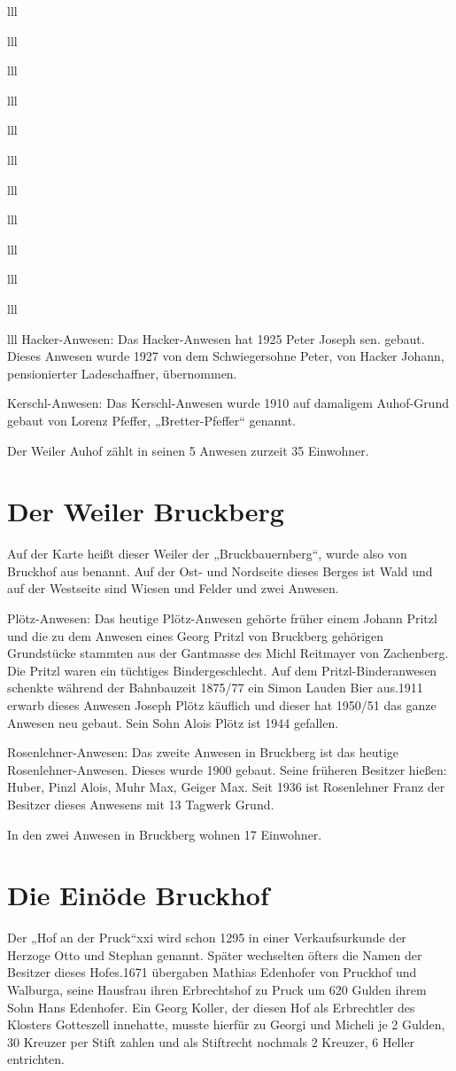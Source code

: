 \documentclass[12pt,a4pager]{book}
\begin{document}
\begin{tabuluar}{lll}
\begin{tabuluar}{lll}
\begin{tabuluar}{lll}
\begin{tabuluar}{lll}
\begin{tabuluar}{lll}
\begin{tabuluar}{lll}
\begin{tabuluar}{lll}
\begin{tabuluar}{lll}
\begin{tabuluar}{lll}
\begin{tabuluar}{lll}
\begin{tabuluar}{lll}
\begin{tabuluar}{lll}
Hacker-Anwesen: Das Hacker-Anwesen hat 1925 Peter Joseph sen. gebaut. Dieses
Anwesen wurde 1927 von dem Schwiegersohne Peter, von Hacker Johann,
pensionierter Ladeschaffner, übernommen.

Kerschl-Anwesen: Das Kerschl-Anwesen wurde 1910 auf damaligem Auhof-Grund gebaut
von Lorenz Pfeffer, „Bretter-Pfeffer“ genannt.

Der Weiler Auhof zählt in seinen 5 Anwesen zurzeit 35 Einwohner.

\section{Der Weiler Bruckberg}

Auf der Karte heißt dieser Weiler der „Bruckbauernberg“, wurde also von Bruckhof
aus benannt. Auf der Ost- und Nordseite dieses Berges ist Wald und auf der
Westseite sind Wiesen und Felder und zwei Anwesen.

Plötz-Anwesen: Das heutige Plötz-Anwesen gehörte früher einem Johann Pritzl und
die zu dem Anwesen eines Georg Pritzl von Bruckberg gehörigen Grundstücke
stammten aus der Gantmasse des Michl Reitmayer von Zachenberg. Die Pritzl waren
ein tüchtiges Bindergeschlecht. Auf dem Pritzl-Binderanwesen schenkte während
der Bahnbauzeit 1875/77 ein Simon Lauden Bier aus.1911 erwarb dieses Anwesen
Joseph Plötz käuflich und dieser hat 1950/51 das ganze Anwesen neu gebaut. Sein
Sohn Alois Plötz ist 1944 gefallen.

Rosenlehner-Anwesen: Das zweite Anwesen in Bruckberg ist das heutige
Rosenlehner-Anwesen. Dieses wurde 1900 gebaut. Seine früheren Besitzer hießen:
Huber, Pinzl Alois, Muhr Max, Geiger Max. Seit 1936 ist Rosenlehner Franz der
Besitzer dieses Anwesens mit 13 Tagwerk Grund.

In den zwei Anwesen in Bruckberg wohnen 17 Einwohner.

\section{Die Einöde Bruckhof}

Der „Hof an der Pruck“xxi wird schon 1295 in einer Verkaufsurkunde der Herzoge
Otto und Stephan genannt. Später wechselten öfters die Namen der Besitzer dieses
Hofes.1671 übergaben Mathias Edenhofer von Pruckhof und Walburga, seine Hausfrau
ihren Erbrechtshof zu Pruck um 620 Gulden ihrem Sohn Hans Edenhofer. Ein Georg
Koller, der diesen Hof als Erbrechtler des Klosters Gotteszell innehatte, musste
hierfür zu Georgi und Micheli je 2 Gulden, 30 Kreuzer per Stift zahlen und als
Stiftrecht nochmals 2 Kreuzer, 6 Heller entrichten.


\end{tabuluar}
\end{tabuluar}
\end{tabuluar}
\end{tabuluar}
\end{tabuluar}
\end{tabuluar}
\end{tabuluar}
\end{tabuluar}
\end{tabuluar}
\end{tabuluar}
\end{tabuluar}
\end{tabuluar}
\end{document}
